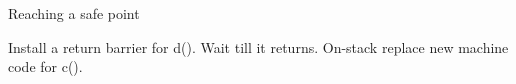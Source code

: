 % 
% 

\begin{frame}{Reaching a safe point}%
\hspace*{-3mm}
\begin{center}
\begin{block}{}
Install a return barrier for d(). Wait till it returns. On-stack replace
new machine code for c().
\end{block}
\end{center}
\end{frame}
